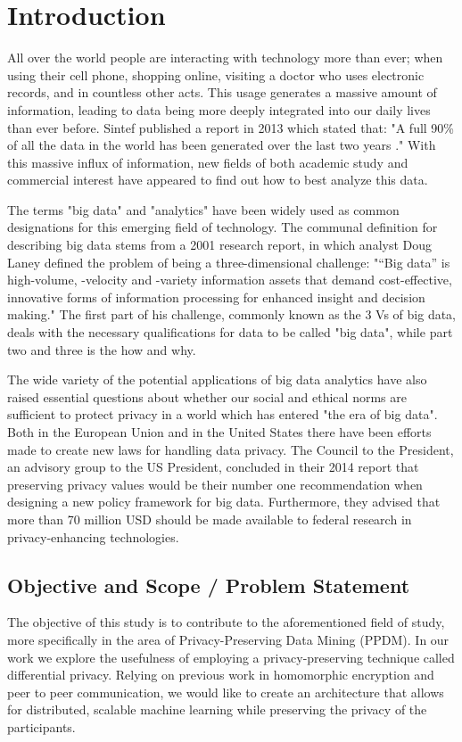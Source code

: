 
\chapter{Introduction}
All over the world people are interacting with technology more than ever; when using their cell phone, shopping online, visiting a doctor who uses electronic records, and in countless other acts. This usage generates a massive amount of information, leading to data being more deeply integrated into our daily lives than ever before. Sintef published a report in 2013 which stated that: "A full 90\% of all the data in the world has been generated over the last two years \cite{dragland2013big}." With this massive influx of information, new fields of both academic study and commercial interest have appeared to find out how to best analyze this data. 

The terms "big data" and "analytics" have been widely used as common designations for this emerging field of technology. The communal definition for describing big data stems from a 2001 research report, in which analyst Doug Laney defined the problem of being a three-dimensional challenge: "“Big data” is high-volume, -velocity and -variety information assets that demand cost-effective, innovative forms of information processing for enhanced insight and decision making." The first part of his challenge, commonly known as the 3 Vs of big data, deals with the necessary qualifications for data to be called "big data", while part two and three is the how and why.  
   
The wide variety of the potential applications of big data analytics have also raised essential questions about whether our social and ethical norms are sufficient to protect privacy in a world which has entered "the era of big data". Both in the European Union and in the United States there have been efforts made to create new laws for handling data privacy. The Council to the President, an advisory group to the US President, concluded in their 2014 report \cite{house2014bigdata} that preserving privacy values would be their number one recommendation when designing a new policy framework for big data. Furthermore, they advised that more than 70 million USD should be made available to federal research in privacy-enhancing technologies. 

\section{Objective and Scope / Problem Statement}
The objective of this study is to contribute to the aforementioned field of study, more specifically in the area of Privacy-Preserving Data Mining (PPDM). In our work we explore the usefulness  of employing a privacy-preserving technique called differential privacy. Relying on previous work in homomorphic encryption and peer to peer communication, we would like to create an architecture that allows for distributed, scalable machine learning while preserving the privacy of the participants. 

